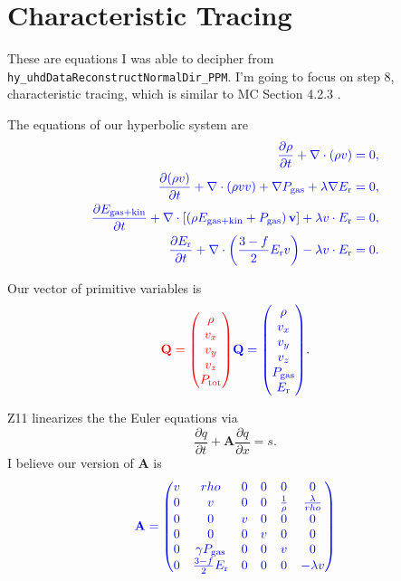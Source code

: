 \documentclass[preprint,11pt]{aastex}
\newcommand{\beq}{\begin{equation}}
\newcommand{\eeq}{\end{equation}}
\newcommand{\bea}{\begin{eqnarray}}
\newcommand{\eea}{\end{eqnarray}}
\begin{document}
\begin{description}
\begin{description}
	
	\end{description}
	\end{description}

\section{Characteristic Tracing}
\label{sec:characteristic}
These are equations I was able to decipher from \verb!hy_uhdDataReconstructNormalDir_PPM!.  I'm going to focus on step $8$, characteristic tracing, which is similar to MC Section 4.2.3 .

The equations of our hyperbolic system are
\bea
{\color{blue}
	\frac{\partial \rho}{\partial t} + \nabla \cdot (\rho v) = 0,
} \\
{\color{blue}
	\frac{\partial (\rho v)}{\partial t} + \nabla \cdot (\rho v v) + \nabla P_{\rm gas} + \lambda \nabla E_{\rm r} = 0,
} \\
{\color{blue}
	\frac{\partial E_{\rm gas+kin}}{\partial t} + \nabla \cdot \left[ \left( \rho E_{\rm gas+kin} + P_{\rm gas} \right) \mathbf{v} \right] + \lambda v \cdot E_{\rm r} = 0,
} \\
{\color{blue}
	\frac{\partial E_{\rm r}}{\partial t} + \nabla \cdot \left( \frac{3-f}{2} E_{\rm r} v \right) - \lambda v \cdot E_{\rm r} = 0.
}
\eea

Our vector of primitive variables is
\beq
{\color{red}\mathbf{Q} = \begin{pmatrix}\rho\\v_x \\ v_y \\ v_z \\ P_{\rm tot}\end{pmatrix}} {\color{blue}\mathbf{Q} = \begin{pmatrix}\rho\\v_x \\ v_y \\ v_z \\ P_{\rm gas} \\ E_{\rm r}\end{pmatrix}}.
\eeq

Z11 linearizes the the Euler equations via
\beq
\frac{\partial q}{\partial t} + \mathbf{A} \frac{\partial q}{\partial x} = s.
\eeq
I believe our version of $\mathbf{A}$ is
\beq
{
	\color{blue}
	\mathbf{A} = 
	\begin{pmatrix}
	v & rho & 0 & 0 & 0 & 0 \\
	0 & v & 0 & 0 & \frac{1}{\rho} & \frac{\lambda}{rho} \\
	0 & 0 & v & 0 & 0 & 0 \\
	0 & 0 & 0 & v & 0 & 0 \\
	0 & \gamma P_{\rm gas} & 0 & 0 & v & 0 \\
	0 & \frac{3-f}{2} E_{\rm r} & 0 & 0 & 0 & -\lambda v
	\end{pmatrix}
}
\eeq
\end{document}
